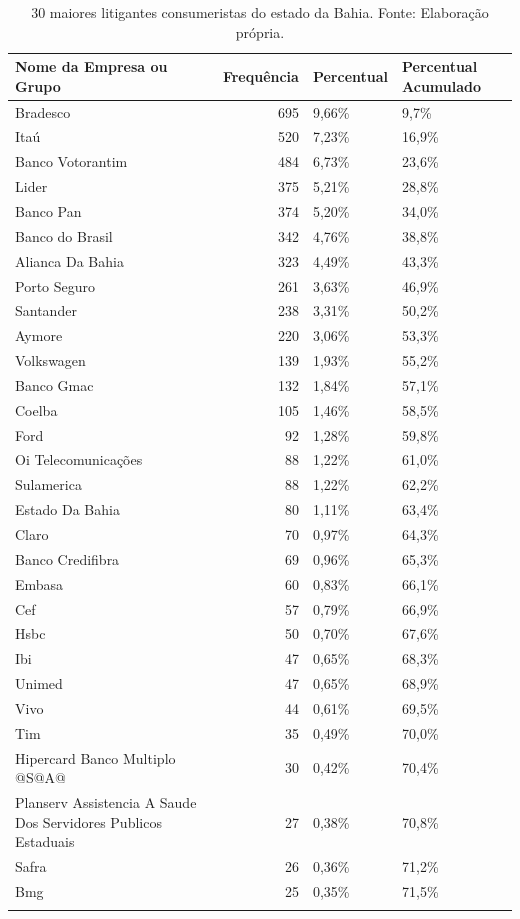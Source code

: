 \documentclass[]{report}
\begin{document}
\begin{longtable}{lrll}
\caption{30 maiores litigantes consumeristas do estado da Bahia. Fonte: Elaboração própria.} \\
  \hline
Nome da Empresa ou Grupo & Frequência & Percentual & Percentual Acumulado \\
  \hline
Bradesco & 695 & 9,66\% & 9,7\% \\
  Itaú & 520 & 7,23\% & 16,9\% \\
  Banco
Votorantim & 484 & 6,73\% & 23,6\% \\
  Lider & 375 & 5,21\% & 28,8\% \\
  Banco Pan & 374 & 5,20\% & 34,0\% \\
  Banco do Brasil & 342 & 4,76\% & 38,8\% \\
  Alianca Da
Bahia & 323 & 4,49\% & 43,3\% \\
  Porto Seguro & 261 & 3,63\% & 46,9\% \\
  Santander & 238 & 3,31\% & 50,2\% \\
  Aymore & 220 & 3,06\% & 53,3\% \\
  Volkswagen & 139 & 1,93\% & 55,2\% \\
  Banco Gmac & 132 & 1,84\% & 57,1\% \\
  Coelba & 105 & 1,46\% & 58,5\% \\
  Ford &  92 & 1,28\% & 59,8\% \\
  Oi
Telecomunicações &  88 & 1,22\% & 61,0\% \\
  Sulamerica &  88 & 1,22\% & 62,2\% \\
  Estado Da Bahia &  80 & 1,11\% & 63,4\% \\
  Claro &  70 & 0,97\% & 64,3\% \\
  Banco
Credifibra &  69 & 0,96\% & 65,3\% \\
  Embasa &  60 & 0,83\% & 66,1\% \\
  Cef &  57 & 0,79\% & 66,9\% \\
  Hsbc &  50 & 0,70\% & 67,6\% \\
  Ibi &  47 & 0,65\% & 68,3\% \\
  Unimed &  47 & 0,65\% & 68,9\% \\
  Vivo &  44 & 0,61\% & 69,5\% \\
  Tim &  35 & 0,49\% & 70,0\% \\
  Hipercard Banco
Multiplo @S@A@ &  30 & 0,42\% & 70,4\% \\
  Planserv
Assistencia
A Saude Dos
Servidores
Publicos
Estaduais &  27 & 0,38\% & 70,8\% \\
  Safra &  26 & 0,36\% & 71,2\% \\
  Bmg &  25 & 0,35\% & 71,5\% \\
   \hline
\hline
\label{unnamed-chunk-65}
\end{longtable}
\end{document}
